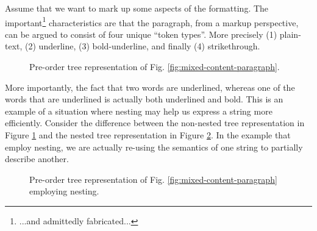 \documentclass{scrreprt}
\begin{document}
Assume that we want to mark up some aspects of the formatting. The important\footnote{...and admittedly fabricated...} characteristics are that the paragraph, from a markup perspective, can be argued to consist of four unique ``token types''. More precisely (1) plain-text, (2) underline, (3) bold-underline, and finally (4) strikethrough.





\begin{figure}[h]
  \centering

  \caption{Pre-order tree representation of Fig. \ref{fig:mixed-content-paragraph}.}
  \label{fig:mixed-content-flat-tree}
\end{figure}



More importantly, the fact that two words are underlined, whereas one of the words that are underlined is actually both underlined and bold. This is an example of a situation where nesting may help us express a string more efficiently. Consider the difference between the non-nested tree representation in Figure \ref{fig:mixed-content-flat-tree} and the nested tree representation in Figure \ref{fig:mixed-content-tree}. In the example that employ nesting, we are actually re-using the semantics of one string to partially describe another.


\begin{figure}[h]
  \centering

  \caption{Pre-order tree representation of Fig. \ref{fig:mixed-content-paragraph} employing nesting.}
  \label{fig:mixed-content-tree}
\end{figure}
\end{document}
